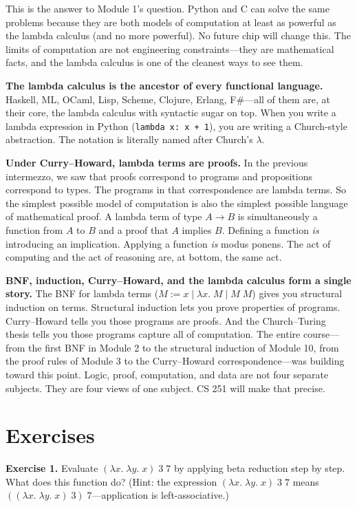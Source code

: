 \documentclass[11pt]{article}
\begin{document}
This is the answer to Module 1's question. Python and C can solve the same problems because they are both models of computation at least as powerful as the lambda calculus (and no more powerful). No future chip will change this. The limits of computation are not engineering constraints---they are mathematical facts, and the lambda calculus is one of the cleanest ways to see them.

\textbf{The lambda calculus is the ancestor of every functional language.} Haskell, ML, OCaml, Lisp, Scheme, Clojure, Erlang, F\#---all of them are, at their core, the lambda calculus with syntactic sugar on top. When you write a lambda expression in Python (\texttt{lambda x: x + 1}), you are writing a Church-style abstraction. The notation is literally named after Church's $\lambda$.

\textbf{Under Curry--Howard, lambda terms are proofs.} In the previous intermezzo, we saw that proofs correspond to programs and propositions correspond to types. The programs in that correspondence are lambda terms. So the simplest possible model of computation is also the simplest possible language of mathematical proof. A lambda term of type $A \to B$ is simultaneously a function from $A$ to $B$ and a proof that $A$ implies $B$. Defining a function \emph{is} introducing an implication. Applying a function \emph{is} modus ponens. The act of computing and the act of reasoning are, at bottom, the same act.

\textbf{BNF, induction, Curry--Howard, and the lambda calculus form a single story.} The BNF for lambda terms ($M := x \mid \lambda x.\; M \mid M\; M$) gives you structural induction on terms. Structural induction lets you prove properties of programs. Curry--Howard tells you those programs are proofs. And the Church--Turing thesis tells you those programs capture all of computation. The entire course---from the first BNF in Module 2 to the structural induction of Module 10, from the proof rules of Module 3 to the Curry--Howard correspondence---was building toward this point. Logic, proof, computation, and data are not four separate subjects. They are four views of one subject. CS 251 will make that precise.

\section{Exercises}

\bigskip
\textbf{Exercise 1.}\label{ex:lambda:1} Evaluate $(\lambda x.\; \lambda y.\; x)\; 3\; 7$ by applying beta reduction step by step. What does this function do? (Hint: the expression $(\lambda x.\; \lambda y.\; x)\; 3\; 7$ means $((\lambda x.\; \lambda y.\; x)\; 3)\; 7$---application is left-associative.)
\end{document}
